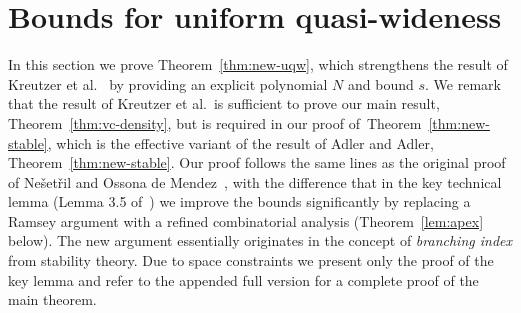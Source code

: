 \section{Bounds for uniform quasi-wideness}\label{sec:uqw}




In this section we prove Theorem~\ref{thm:new-uqw}, which strengthens the 
result of Kreutzer et al.~\cite{siebertz2016polynomial} by providing an explicit polynomial $N$ and bound $s$. 
We remark that the result of Kreutzer et al.~is sufficient to prove our main result, Theorem~\ref{thm:vc-density}, but is required in our proof of~Theorem~\ref{thm:new-stable}, which is the effective 
variant of the result of Adler and Adler, Theorem~\ref{thm:new-stable}.
%
%
%
%
%
Our proof follows the same lines as the original proof of Ne\v set\v ril and Ossona de Mendez~\cite{nevsetvril2010first}, with the difference that in the key technical lemma (Lemma 3.5 of~\cite{nevsetvril2010first}) %
we improve the bounds significantly by replacing a Ramsey argument with a refined combinatorial analysis (Theorem~\ref{lem:apex} below).
The new argument essentially originates in the concept of {\em{branching index}} from stability theory. 
Due to space constraints we present only the proof of 
the key lemma and refer to the appended full version
for a complete proof of the main theorem. 

